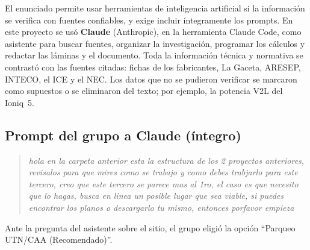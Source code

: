 El enunciado permite usar herramientas de inteligencia artificial si la información se verifica con fuentes confiables, y exige incluir íntegramente los prompts. En este proyecto se usó \textbf{Claude} (Anthropic), en la herramienta Claude Code, como asistente para buscar fuentes, organizar la investigación, programar los cálculos y redactar las láminas y el documento. Toda la información técnica y normativa se contrastó con las fuentes citadas: fichas de los fabricantes, La Gaceta, ARESEP, INTECO, el ICE y el NEC. Los datos que no se pudieron verificar se marcaron como supuestos \supuesto{} o se eliminaron del texto; por ejemplo, la potencia V2L del Ioniq~5.

\subsection*{Prompt del grupo a Claude (íntegro)}
\begin{quote}\itshape
hola en la carpeta anterior esta la estructura de los 2 proyectos anteriores, revisalos para que mires como se trabajo y como debes trabjarlo para este tercero, creo que este tercero se parece mas al 1ro, el caso es que necesito que lo hagas, busca en linea un posible lugar que sea viable, si puedes encontrar los planos o descargarlo tu mismo, entonces porfavor empieza
\end{quote}
Ante la pregunta del asistente sobre el sitio, el grupo eligió la opción ``Parqueo UTN/CAA (Recomendado)''.

